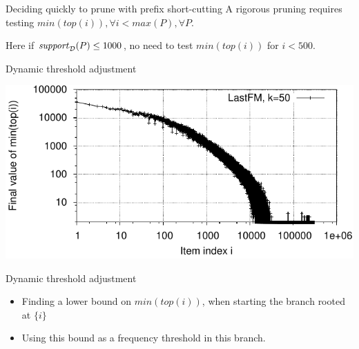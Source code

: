 \documentclass[table]{beamer}
\begin{document}
\begin{frame}{Deciding quickly to prune with prefix short-cutting}
  A rigorous pruning requires testing $min(top(i)), \forall i < max(P), \forall P$.

  \pause
  \begin{centering}
  \end{centering}
  \pause

  Here if $\mathit{support}_{\cal D}(P) \leq 1000$, no need to test $min(top(i))$ for $i < 500$.
\end{frame}

\begin{frame}{Dynamic threshold adjustment}
  \begin{centering}
    \includegraphics{fig/minTopPerItem/lastfm-s2-k50-minTopPerItem.pdf}\\
  \end{centering}
  \pause
  \vspace{1em}
  \begin{block}{Dynamic threshold adjustment}
    \begin{itemize}
      \item Finding a lower bound on $\mathit{min}(\mathit{top}(i))$, when starting the branch rooted at $\{i\}$
      \item Using this bound as a frequency threshold in this branch.
    \end{itemize}
  \end{block}
\end{frame}
\end{document}

